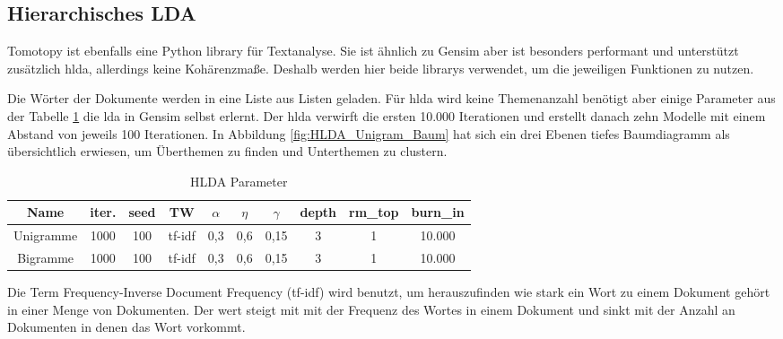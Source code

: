 \subsection{Hierarchisches LDA}

Tomotopy ist ebenfalls eine Python library für Textanalyse. Sie ist ähnlich zu Gensim aber ist besonders performant und unterstützt zusätzlich \ac{hlda}, allerdings keine Kohärenzmaße. Deshalb werden hier beide librarys verwendet, um die jeweiligen Funktionen zu nutzen.

Die Wörter der Dokumente werden in eine Liste aus Listen geladen. Für \ac{hlda} wird keine Themenanzahl benötigt aber einige Parameter aus der Tabelle \ref{table:HLDA_Parameter} die \ac{lda} in Gensim selbst erlernt. Der \ac{hlda} verwirft die ersten 10.000 Iterationen und erstellt danach zehn Modelle mit einem Abstand von jeweils 100 Iterationen. \parencite[vgl.][S. 6]{griffiths2004hierarchical}  In Abbildung \ref{fig:HLDA_Unigram_Baum} hat sich ein drei Ebenen tiefes Baumdiagramm als übersichtlich erwiesen, um Überthemen zu finden und Unterthemen zu clustern.

\begin{table}
	\RawFloats
	\centering
	\caption{HLDA Parameter}
	\begin{tabular}{|c|c|c|c|c|c|c|c|c|c|}
		\hline 
		Name& iter. & seed & TW & $\alpha$ & $\eta$ & $\gamma$ & depth & rm\_top & burn\_in \\ 
		\hline 
		Unigramme& 1000 & 100 & \ac{tf-idf} & 0,3 & 0,6 & 0,15 & 3 & 1 & 10.000 \\ 
		\hline 
		Bigramme& 1000 & 100 & \ac{tf-idf} & 0,3 & 0,6 & 0,15 & 3 & 1 & 10.000  \\ 
		\hline  
	\end{tabular}
	\label{table:HLDA_Parameter}
\end{table} 

Die Term Frequency-Inverse Document Frequency (\ac{tf-idf}) wird benutzt, um herauszufinden wie stark ein Wort zu einem Dokument gehört in einer Menge von Dokumenten. \parencite{luhn1957statistical}  \parencite{jones1972statistical} Der wert steigt mit mit der Frequenz des Wortes in einem Dokument und sinkt mit der Anzahl an Dokumenten in denen das Wort vorkommt.

